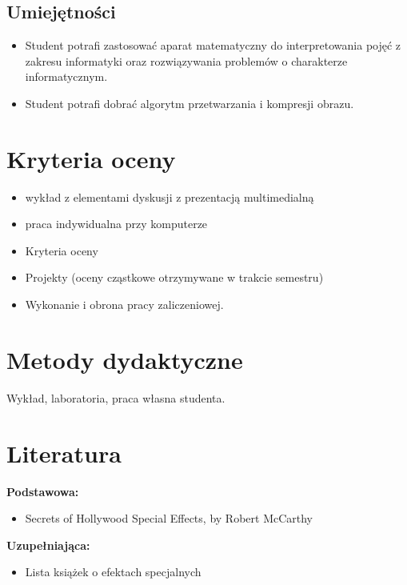 \documentclass[12pt, a4paper]{article}
\begin{document}
\subsection*{Umiejętności}
\begin{itemize}
  \item Student potrafi  zastosować aparat matematyczny do interpretowania pojęć z zakresu informatyki oraz rozwiązywania problemów o charakterze informatycznym.
  \item Student potrafi  dobrać algorytm przetwarzania i kompresji obrazu.
\end{itemize}

\section{Kryteria oceny}

\begin{itemize}
  \item wykład z elementami dyskusji z prezentacją multimedialną
  \item praca indywidualna przy komputerze
  \item Kryteria oceny
  \item Projekty (oceny cząstkowe otrzymywane w trakcie semestru)
  \item Wykonanie i obrona pracy zaliczeniowej.
\end{itemize}

\section{Metody dydaktyczne}

Wykład, laboratoria, praca własna studenta.

\section{Literatura}

\textbf{Podstawowa:}
\begin{itemize}
  \item Secrets of Hollywood Special Effects, by Robert McCarthy
\end{itemize}

\textbf{Uzupełniająca:}
\begin{itemize}
  \item Lista książek o efektach specjalnych
\end{itemize}
\end{document}
